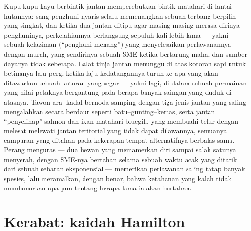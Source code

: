 \begin{example}\label{ex:b3:behavioural-ecology:games}
Kupu-kupu kayu berbintik jantan memperebutkan bintik matahari di lantai hutannya:
sang penghuni nyaris selalu memenangkan sebuah terbang berpilin yang singkat, dan ketika dua
jantan ditipu agar masing-masing merasa dirinya penghuninya, perkelahiannya
berlangsung sepuluh kali lebih lama --- yakni sebuah kelaziman (``penghuni menang'') yang menyelesaikan
perlawanannya dengan murah, yang sendirinya sebuah SME ketika bertarung mahal dan
sumber dayanya tidak seberapa. Lalat tinja jantan menunggu di atas kotoran sapi untuk
betinanya lalu pergi ketika laju kedatangannya turun ke apa yang akan ditawarkan sebuah kotoran
yang segar --- yakni  lagi, di dalam sebuah permainan yang nilai
petaknya bergantung pada berapa banyak saingan yang duduk di atasnya. Tawon ara, kadal
bernoda samping dengan tiga jenis jantan yang saling mengalahkan secara berdaur seperti
batu--gunting--kertas, serta jantan ``penyelinap'' salmon dan ikan matahari
bluegill, yang membuahi telur dengan melesat melewati jantan teritorial
yang tidak dapat dilawannya, semuanya campuran yang ditahan pada kekerapan tempat
alternatifnya berbalas sama. Perang menguras --- dua hewan yang
memamerkan diri sampai salah satunya menyerah, dengan SME-nya bertahan selama sebuah waktu acak
yang ditarik dari sebuah sebaran eksponensial --- memerikan
perlawanan saling tatap banyak spesies, lalu meramalkan, dengan benar, bahwa ketahanan
yang kalah tidak membocorkan apa pun tentang berapa lama ia akan bertahan.
\end{example}

\section{Kerabat: kaidah Hamilton}

